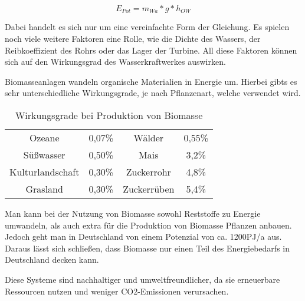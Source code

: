 \begin{equation*}
    E_{Pot} = m_{Wa} * g * h_{OW}
\end{equation*}

Dabei handelt es sich nur um eine vereinfachte Form der Gleichung. Es spielen noch
viele weitere Faktoren eine Rolle, wie die Dichte des Wassers, der
Reibkoeffizient des Rohrs oder das Lager der Turbine. All diese Faktoren können
sich auf den Wirkungsgrad des Wasserkraftwerkes
auswirken.\cite{aufleger2020stromerzeugung}

Biomasseanlagen wandeln organische Materialien in Energie um. Hierbei gibts es
sehr unterschiedliche Wirkungsgrade, je nach Pflanzenart, welche verwendet
wird.

\begin{table}[h]
    \centering
    \captionsetup{font=small}
    \caption{Wirkungsgrade bei Produktion von Biomasse}
    \label{tab:tabelle1}
    \begin{tabular}{cc|cc}
        Ozeane           & 0,07\% & Wälder      & 0,55\% \\
        Süßwasser        & 0,50\% & Mais        & 3,2\%  \\
        Kulturlandschaft & 0,30\% & Zuckerrohr  & 4,8\%  \\
        Grasland         & 0,30\% & Zuckerrüben & 5,4\%
    \end{tabular}
\end{table}

Man kann bei der Nutzung von Biomasse sowohl Reststoffe zu Energie umwandeln,
als auch extra für die Produktion von Biomasse Pflanzen anbauen. Jedoch geht
man in Deutschland von einem Potenzial von ca. 1200PJ/a aus. Daraus lässt sich
schließen, dass Biomasse nur einen Teil des Energiebedarfs in Deutschland
decken kann.\cite{quaschning2021regenerative}

Diese Systeme sind nachhaltiger und umweltfreundlicher, da sie erneuerbare
Ressourcen nutzen und weniger CO2-Emissionen verursachen.